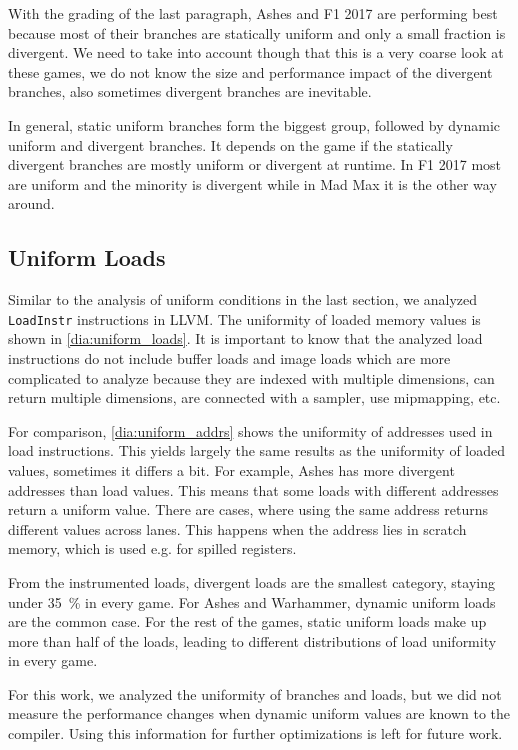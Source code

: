 With the grading of the last paragraph, Ashes and F1 2017 are performing best because most of their branches are statically uniform and only a small fraction is divergent.
We need to take into account though that this is a very coarse look at these games, we do not know the size and performance impact of the divergent branches, also sometimes divergent branches are inevitable.

In general, static uniform branches form the biggest group, followed by dynamic uniform and divergent branches.
It depends on the game if the statically divergent branches are mostly uniform or divergent at runtime.
In F1 2017 most are uniform and the minority is divergent while in Mad Max it is the other way around.

\subsection{Uniform Loads}
\label{sub:eval_uniform_loads}
Similar to the analysis of uniform conditions in the last section, we analyzed \texttt{LoadInstr} instructions in LLVM.
The uniformity of loaded memory values is shown in \cref{dia:uniform_loads}.
It is important to know that the analyzed load instructions do not include buffer loads and image loads which are more complicated to analyze because they are indexed with multiple dimensions, can return multiple dimensions, are connected with a sampler, use mipmapping, etc.


For comparison, \cref{dia:uniform_addrs} shows the uniformity of addresses used in load instructions.
This yields largely the same results as the uniformity of loaded values, sometimes it differs a bit.
For example, Ashes has more divergent addresses than load values.
This means that some loads with different addresses return a uniform value.
There are cases, where using the same address returns different values across lanes.
This happens when the address lies in scratch memory, which is used e.g. for spilled registers.


From the instrumented loads, divergent loads are the smallest category, staying under \SI{35}{\percent} in every game.
For Ashes and Warhammer, dynamic uniform loads are the common case. For the rest of the games, static uniform loads make up more than half of the loads, leading to different distributions of load uniformity in every game.

For this work, we analyzed the uniformity of branches and loads, but we did not measure the performance changes when dynamic uniform values are known to the compiler.
Using this information for further optimizations is left for future work.

